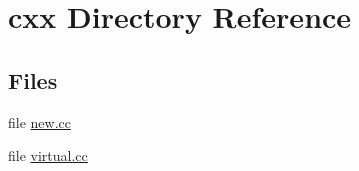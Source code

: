 \hypertarget{dir_000000}{}\section{cxx Directory Reference}
\label{dir_000000}
\subsection*{Files}
\begin{DoxyCompactItemize}
\item 
file \hyperlink{new_8cc}{new.\+cc}
\item 
file \hyperlink{virtual_8cc}{virtual.\+cc}
\end{DoxyCompactItemize}
